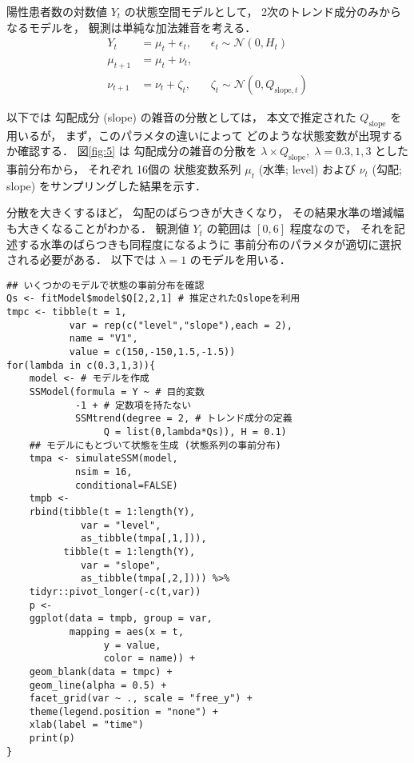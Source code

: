 \documentclass[10pt,oneside,fleqn]{scrartcl}
\begin{document}
陽性患者数の対数値 \(Y_{t}\) の状態空間モデルとして，
2次のトレンド成分のみからなるモデルを，
観測は単純な加法雑音を考える．
\begin{align}
  Y_{t}
  &=
  \mu_{t}+\epsilon_{t},&&\epsilon_{t}\sim\mathcal{N}(0,H_{t})\\
  \mu_{t+1}
  &=\mu_{t}+\nu_{t},\\
  \nu_{t+1}
  &=\nu_{t}+\zeta_{t},&&\zeta_{t}\sim\mathcal{N}(0,Q_{\mathrm{slope},t})
\end{align}

以下では
勾配成分 (slope) の雑音の分散としては，
本文で推定された \(Q_{\mathrm{slope}}\) を用いるが，
まず，このパラメタの違いによって
どのような状態変数が出現するか確認する．
図\ref{fig:5} は
勾配成分の雑音の分散を
\(\lambda\times Q_{\mathrm{slope}},\;\lambda=0.3,1,3\)
とした事前分布から，
それぞれ
16個の
状態変数系列
\(\mu_{t}\) (水準; level)
および
\(\nu_{t}\) (勾配; slope)
をサンプリングした結果を示す．

分散を大きくするほど，
勾配のばらつきが大きくなり，
その結果水準の増減幅も大きくなることがわかる．
観測値 \(Y_{t}\) の範囲は \([0,6]\) 程度なので，
それを記述する水準のばらつきも同程度になるように
事前分布のパラメタが適切に選択される必要がある．
以下では
\(\lambda=1\)
のモデルを用いる．

\begin{figure*}[htbp]
  \centering
\end{figure*}

\begin{verbatim}
## いくつかのモデルで状態の事前分布を確認
Qs <- fitModel$model$Q[2,2,1] # 推定されたQslopeを利用
tmpc <- tibble(t = 1,
	       var = rep(c("level","slope"),each = 2),
	       name = "V1",
	       value = c(150,-150,1.5,-1.5))
for(lambda in c(0.3,1,3)){
    model <- # モデルを作成
	SSModel(formula = Y ~ # 目的変数
		    -1 + # 定数項を持たない
		    SSMtrend(degree = 2, # トレンド成分の定義
			     Q = list(0,lambda*Qs)), H = 0.1)
    ## モデルにもとづいて状態を生成 (状態系列の事前分布)
    tmpa <- simulateSSM(model,
			nsim = 16,
			conditional=FALSE)
    tmpb <- 
	rbind(tibble(t = 1:length(Y),
		     var = "level",
		     as_tibble(tmpa[,1,])),
	      tibble(t = 1:length(Y),
		     var = "slope",
		     as_tibble(tmpa[,2,]))) %>%
	tidyr::pivot_longer(-c(t,var)) 
    p <- 
	ggplot(data = tmpb, group = var,
	       mapping = aes(x = t,
			     y = value,
			     color = name)) +
	geom_blank(data = tmpc) +
	geom_line(alpha = 0.5) +
	facet_grid(var ~ ., scale = "free_y") +
	theme(legend.position = "none") +
	xlab(label = "time")
    print(p)
}
\end{verbatim}
\end{document}
